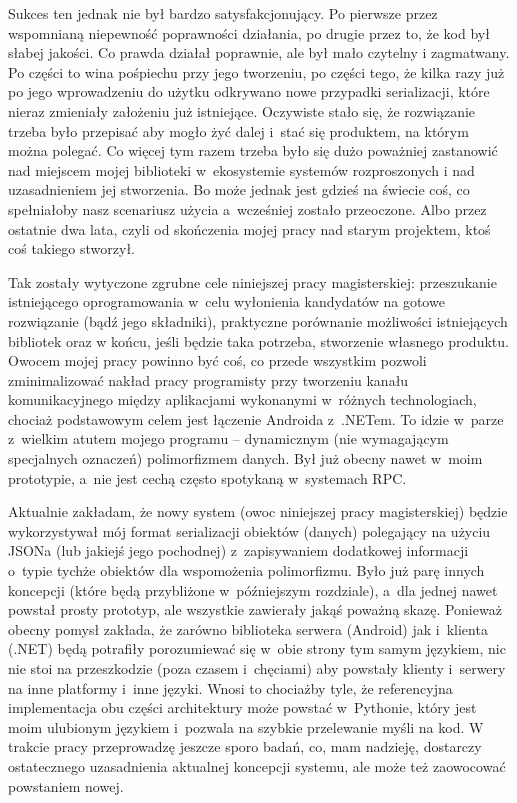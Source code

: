 Sukces ten jednak nie był bardzo satysfakcjonujący. Po pierwsze przez wspomnianą niepewność poprawności działania, po drugie przez to, że kod był słabej jakości. Co prawda działał poprawnie, ale był mało czytelny i zagmatwany. Po części to wina pośpiechu przy jego tworzeniu, po części tego, że kilka razy już po jego wprowadzeniu do użytku odkrywano nowe przypadki serializacji, które nieraz zmieniały założeniu już istniejące. Oczywiste stało się, że rozwiązanie trzeba było przepisać aby mogło żyć dalej i~stać się produktem, na którym można polegać. Co więcej tym razem trzeba było się dużo poważniej zastanowić nad miejscem mojej biblioteki w~ekosystemie systemów rozproszonych i nad uzasadnieniem jej stworzenia. Bo może jednak jest gdzieś na świecie coś, co spełniałoby nasz scenariusz użycia a~wcześniej zostało przeoczone. Albo przez ostatnie dwa lata, czyli od skończenia mojej pracy nad starym projektem, ktoś coś takiego stworzył.

Tak zostały wytyczone zgrubne cele niniejszej pracy magisterskiej: przeszukanie istniejącego oprogramowania w~celu wyłonienia kandydatów na gotowe rozwiązanie (bądź jego składniki), praktyczne porównanie możliwości istniejących bibliotek oraz w końcu, jeśli będzie taka potrzeba, stworzenie własnego produktu. Owocem mojej pracy powinno być coś, co przede wszystkim pozwoli zminimalizować nakład pracy programisty przy tworzeniu kanału komunikacyjnego między aplikacjami wykonanymi w~różnych technologiach, chociaż podstawowym celem jest łączenie Androida z~.NETem. To idzie w~parze z~wielkim atutem mojego programu -- dynamicznym (nie wymagającym specjalnych oznaczeń) polimorfizmem danych. Był już obecny nawet w~moim prototypie, a~nie jest cechą często spotykaną w~systemach RPC.

Aktualnie zakładam, że nowy system (owoc niniejszej pracy magisterskiej) będzie wykorzystywał mój format serializacji obiektów (danych) polegający na użyciu JSONa (lub jakiejś jego pochodnej) z~zapisywaniem dodatkowej informacji o~typie tychże obiektów dla wspomożenia polimorfizmu. Było już parę innych koncepcji (które będą przybliżone w~późniejszym rozdziale), a~dla jednej nawet powstał prosty prototyp, ale wszystkie zawierały jakąś poważną skazę. Ponieważ obecny pomysł zakłada, że zarówno biblioteka serwera (Android) jak i~klienta (.NET) będą potrafiły porozumiewać się w~obie strony tym samym językiem, nic nie stoi na przeszkodzie (poza czasem i~chęciami) aby powstały klienty i~serwery na inne platformy i~inne języki. Wnosi to chociażby tyle, że referencyjna implementacja obu części architektury może powstać w~Pythonie, który jest moim ulubionym językiem i~pozwala na szybkie przelewanie myśli na kod. W trakcie pracy przeprowadzę jeszcze sporo badań, co, mam nadzieję, dostarczy ostatecznego uzasadnienia aktualnej koncepcji systemu, ale może też zaowocować powstaniem nowej.

